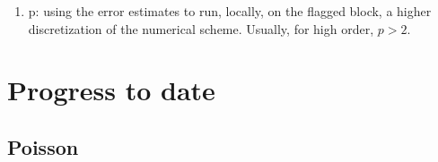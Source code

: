 \documentclass{beamer}
\begin{document}
\begin{frame}
\begin{minipage}[t][1\textheight]{1\textwidth}
\begin{enumerate}[1.]
\vspace{-5pt}
\item p: using the error estimates to run, locally, on the flagged block, a higher discretization of the numerical scheme. Usually, for high order,  $ p > 2 $.

\end{enumerate}
\end{minipage}

\end{frame}


\section[Progress]{Progress to date}

\subsection{Poisson}
\end{document}
